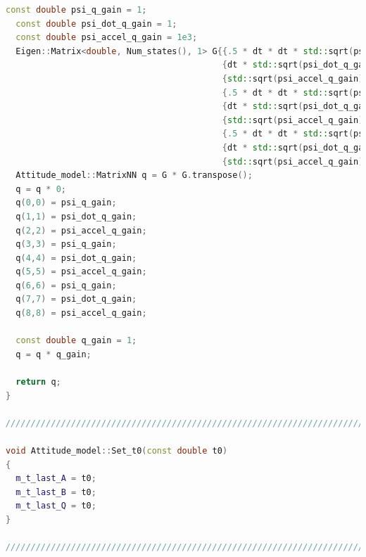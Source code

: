 \documentclass[applsci,article,submit,pdftex,moreauthors]{Definitions/mdpi}
\begin{document}
\begin{lstlisting}[language=c++]
  const double psi_q_gain = 1;
  const double psi_dot_q_gain = 1;
  const double psi_accel_q_gain = 1e3;
  Eigen::Matrix<double, Num_states(), 1> G{{.5 * dt * dt * std::sqrt(psi_q_gain)},
                                           {dt * std::sqrt(psi_dot_q_gain)},
                                           {std::sqrt(psi_accel_q_gain)},
                                           {.5 * dt * dt * std::sqrt(psi_q_gain)},
                                           {dt * std::sqrt(psi_dot_q_gain)},
                                           {std::sqrt(psi_accel_q_gain)},
                                           {.5 * dt * dt * std::sqrt(psi_q_gain)},
                                           {dt * std::sqrt(psi_dot_q_gain)},
                                           {std::sqrt(psi_accel_q_gain)}};
  Attitude_model::MatrixNN q = G * G.transpose();
  q = q * 0;
  q(0,0) = psi_q_gain;
  q(1,1) = psi_dot_q_gain;
  q(2,2) = psi_accel_q_gain;
  q(3,3) = psi_q_gain;
  q(4,4) = psi_dot_q_gain;
  q(5,5) = psi_accel_q_gain;
  q(6,6) = psi_q_gain;
  q(7,7) = psi_dot_q_gain;
  q(8,8) = psi_accel_q_gain;

  const double q_gain = 1;
  q = q * q_gain;

  return q;
}

///////////////////////////////////////////////////////////////////////

void Attitude_model::Set_t0(const double t0)
{
  m_t_last_A = t0;
  m_t_last_B = t0;
  m_t_last_Q = t0;
}

///////////////////////////////////////////////////////////////////////

\end{lstlisting}
\end{document}
